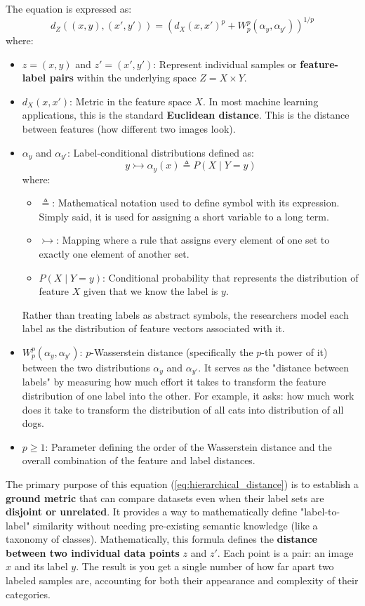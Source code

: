\documentclass[11pt, a4paper]{article}
\theoremstyle{plain} %
\theoremstyle{definition} %
\begin{document}
			The equation is expressed as:
			\begin{equation}
				\label{eq:hierarchical_distance}
				d_Z((x, y), (x', y')) = \left(d_X(x, x')^p + W_p^p(\alpha_y, \alpha_{y'})\right)^{1/p}
			\end{equation}
			where:
			\begin{itemize}
				\item $z = (x, y)$ and $z' = (x', y')$: Represent individual samples or \textbf{feature-label pairs} within the underlying space $Z = X \times Y$.
				\item $d_X(x, x')$: Metric in the feature space $X$. In most machine learning applications, this is the standard \textbf{Euclidean distance}. This is the distance between features (how different two images look).
				\item $\alpha_y$ and $\alpha_{y'}$: Label-conditional distributions defined as: 
				$$y \rightarrowtail \alpha_y(x)  \triangleq  P(X \mid Y = y)$$
				where:
				\begin{itemize}
					\item $\triangleq$: Mathematical notation used to define symbol with its expression. Simply said, it is used for assigning a short variable to a long term.
					\item $\rightarrowtail$: Mapping where a rule that assigns every element of one set to exactly one element of another set.
					\item $P(X \mid Y = y)$: Conditional probability that represents the distribution of feature $X$ given that we know the label is $y$.
				\end{itemize}
				Rather than treating labels as abstract symbols, the researchers model each label as the distribution of feature vectors associated with it.
				\item $W_p^p(\alpha_y, \alpha_{y'})$: $p$-Wasserstein distance (specifically the $p$-th power of it) between the two distributions $\alpha_y$ and $\alpha_{y'}$. It serves as the "distance between labels" by measuring how much effort it takes to transform the feature distribution of one label into the other. For example, it asks: how much work does it take to transform the distribution of all cats into distribution of all dogs.
				\item $p \geq 1$: Parameter defining the order of the Wasserstein distance and the overall combination of the feature and label distances.
			\end{itemize}
			The primary purpose of this equation (\cref{eq:hierarchical_distance}) is to establish a \textbf{ground metric} that can compare datasets even when their label sets are \textbf{disjoint or unrelated}. It provides a way to mathematically define "label-to-label" similarity without needing pre-existing semantic knowledge (like a taxonomy of classes). Mathematically, this formula defines the \textbf{distance between two individual data points} $z$ and $z'$. Each point is a pair: an image $x$ and its label $y$. The result is you get a single number of how far apart two labeled samples are, accounting for both their appearance and complexity of their categories.
\end{document}
